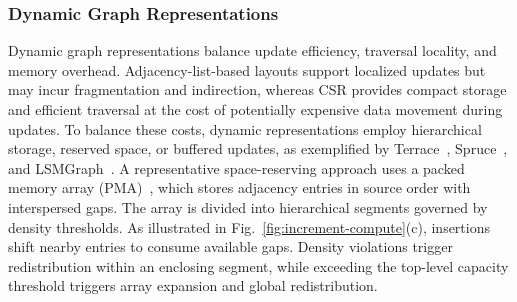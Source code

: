 

\subsubsection{Dynamic Graph Representations}
Dynamic graph representations balance update efficiency, traversal locality, and memory overhead. Adjacency-list-based layouts support localized updates but may incur fragmentation and indirection, whereas CSR provides compact storage and efficient traversal at the cost of potentially expensive data movement during updates. To balance these costs, dynamic
representations employ hierarchical storage, reserved space, or buffered updates, as exemplified by Terrace~\cite{2021-Terrace}, Spruce~\cite{2024-Spruce}, and LSMGraph~\cite{2024-LSMGraph}. A representative space-reserving approach uses a packed memory array (PMA)~\cite{2017-GPMA,2018-pcsr}, which stores adjacency entries in source order with interspersed gaps. The array is divided into hierarchical segments governed by density thresholds. As illustrated in Fig.~\ref{fig:increment-compute}(c), insertions shift nearby entries to consume available gaps. Density violations trigger redistribution within an enclosing segment, while exceeding the top-level capacity threshold triggers array expansion and global redistribution.

